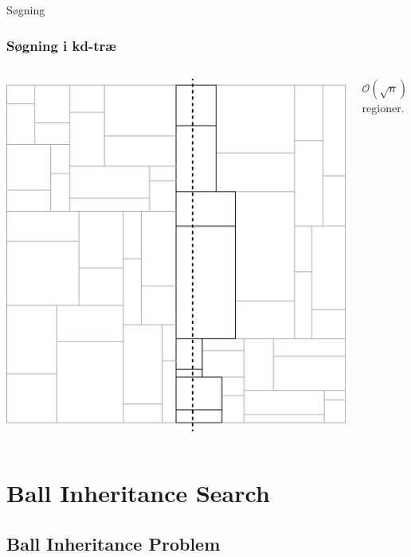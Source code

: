 \documentclass[pdf]{beamer}
\begin{document}
\begin{frame}{Søgning}
  \frametitle{Søgning i kd-træ}
  \begin{columns}
  \begin{center}
    \includegraphics[scale=0.75]{pictures/kd_bound2.png}
  \end{center}
  $\mathcal{O}(\sqrt{n})$ regioner.
\end{columns}
\end{frame}



\section{Ball Inheritance Search}

\subsection{Ball Inheritance Problem}
\end{document}
